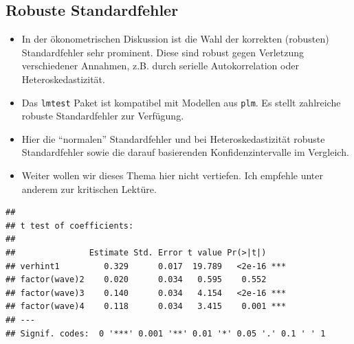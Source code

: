 \documentclass[]{book}
\newenvironment{Shaded}{\begin{snugshade}}{\end{snugshade}}
\newcommand{\CommentTok}[1]{\textcolor[rgb]{0.56,0.35,0.01}{\textit{#1}}}
\newcommand{\DecValTok}[1]{\textcolor[rgb]{0.00,0.00,0.81}{#1}}
\newcommand{\KeywordTok}[1]{\textcolor[rgb]{0.13,0.29,0.53}{\textbf{#1}}}
\newcommand{\NormalTok}[1]{#1}
\newcommand{\OperatorTok}[1]{\textcolor[rgb]{0.81,0.36,0.00}{\textbf{#1}}}
\newcommand{\StringTok}[1]{\textcolor[rgb]{0.31,0.60,0.02}{#1}}
\begin{document}
\hypertarget{robuste-standardfehler}{%
\subsection*{Robuste Standardfehler}\label{robuste-standardfehler}}

\begin{itemize}
\item
  In der ökonometrischen Diskussion ist die Wahl der korrekten (robusten) Standardfehler sehr prominent. Diese sind robust gegen Verletzung verschiedener Annahmen, z.B. durch serielle Autokorrelation oder Heteroskedastizität.
\item
  Das \texttt{lmtest} Paket \citep{R-lmtest} ist kompatibel mit Modellen aus \texttt{plm}. Es stellt zahlreiche robuste Standardfehler zur Verfügung.
\item
  Hier die ``normalen'' Standardfehler und bei Heteroskedastizität robuste Standardfehler sowie die darauf basierenden Konfidenzintervalle im Vergleich.
\item
  Weiter wollen wir dieses Thema hier nicht vertiefen. Ich empfehle unter anderem \citet{kingHowRobustStandard2015} zur kritischen Lektüre.
\end{itemize}

\begin{Shaded}
\end{Shaded}

\begin{verbatim}
## 
## t test of coefficients:
## 
##               Estimate Std. Error t value Pr(>|t|)    
## verhint1         0.329      0.017  19.789   <2e-16 ***
## factor(wave)2    0.020      0.034   0.595    0.552    
## factor(wave)3    0.140      0.034   4.154   <2e-16 ***
## factor(wave)4    0.118      0.034   3.415    0.001 ***
## ---
## Signif. codes:  0 '***' 0.001 '**' 0.01 '*' 0.05 '.' 0.1 ' ' 1
\end{verbatim}

\begin{Shaded}
\end{Shaded}
\end{document}
